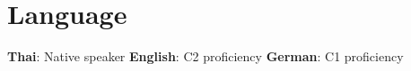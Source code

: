 \section{Language}
\resumeSubHeadingListStart
\item{
            \textbf{Thai}{: Native speaker}
            \hfill
            \textbf{English}{: C2 proficiency}
            \hfill
            \textbf{German}{: C1 proficiency}
      }
\resumeSubHeadingListEnd

